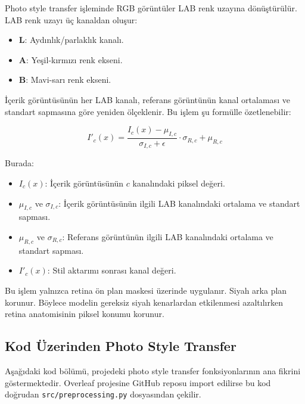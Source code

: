\documentclass[12pt,a4paper]{article}
\begin{document}
Photo style transfer işleminde RGB görüntüler LAB renk uzayına dönüştürülür. LAB renk uzayı üç kanaldan oluşur:

\begin{itemize}
    \item \textbf{L}: Aydınlık/parlaklık kanalı.
    \item \textbf{A}: Yeşil-kırmızı renk ekseni.
    \item \textbf{B}: Mavi-sarı renk ekseni.
\end{itemize}

İçerik görüntüsünün her LAB kanalı, referans görüntünün kanal ortalaması ve standart sapmasına göre yeniden ölçeklenir. Bu işlem şu formülle özetlenebilir:

\begin{equation}
I'_{c}(x) =
\frac{I_{c}(x) - \mu_{I,c}}{\sigma_{I,c} + \epsilon}
\cdot \sigma_{R,c}
+ \mu_{R,c}
\end{equation}

Burada:

\begin{itemize}
    \item $I_{c}(x)$: İçerik görüntüsünün $c$ kanalındaki piksel değeri.
    \item $\mu_{I,c}$ ve $\sigma_{I,c}$: İçerik görüntüsünün ilgili LAB kanalındaki ortalama ve standart sapması.
    \item $\mu_{R,c}$ ve $\sigma_{R,c}$: Referans görüntünün ilgili LAB kanalındaki ortalama ve standart sapması.
    \item $I'_{c}(x)$: Stil aktarımı sonrası kanal değeri.
\end{itemize}

Bu işlem yalnızca retina ön plan maskesi üzerinde uygulanır. Siyah arka plan korunur. Böylece modelin gereksiz siyah kenarlardan etkilenmesi azaltılırken retina anatomisinin piksel konumu korunur.

\subsection{Kod Üzerinden Photo Style Transfer}

Aşağıdaki kod bölümü, projedeki photo style transfer fonksiyonlarının ana fikrini göstermektedir. Overleaf projesine GitHub reposu import edilirse bu kod doğrudan \texttt{src/preprocessing.py} dosyasından çekilir.


\end{document}
